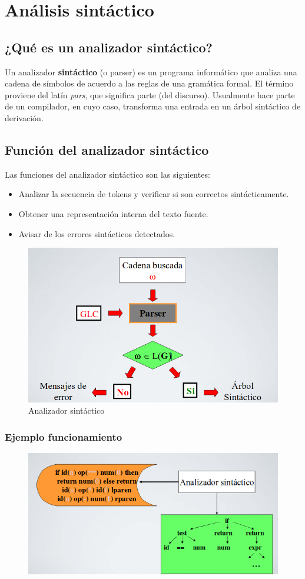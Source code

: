 \chapter{Análisis sintáctico}
\section{¿Qué es un analizador sintáctico?}
Un analizador \textbf{sintáctico} (o parser) es un programa informático que analiza una cadena de símbolos de acuerdo a las reglas de una gramática formal. El término proviene del latín \textit{pars}, que significa parte (del discurso). Usualmente hace parte de un compilador, en cuyo caso, transforma una entrada en un árbol sintáctico de derivación.
\section{Función del analizador sintáctico}
Las funciones del analizador sintáctico son las siguientes:
\begin{itemize}
	\item Analizar la secuencia de tokens y verificar si son correctos sintácticamente.
	\item Obtener una representación interna del texto fuente.
	\item Avisar de los errores sintácticos detectados.
\end{itemize}
\begin{figure}[h]
	\centering
	\includegraphics[width=0.7\linewidth]{img/11}
	\caption{Analizador sintáctico}
	\label{fig:5}
\end{figure}
\clearpage
\subsection{Ejemplo funcionamiento}
\begin{figure}[h]
	\centering
	\includegraphics[width=0.7\linewidth]{img/ejemplo_sintactico}
	\caption{}
	\label{fig:ejemplosintactico}
\end{figure}

